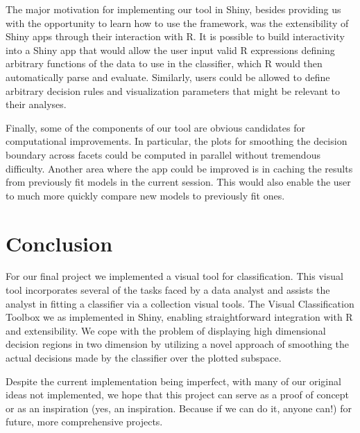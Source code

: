 \documentclass[tog]{acmsiggraph}
\begin{document}
The major motivation for implementing our tool in Shiny, besides providing us with the opportunity to learn how to use the framework, was the extensibility of Shiny apps through their interaction with R. It is possible to build interactivity into a Shiny app that would allow the user input valid R expressions defining arbitrary functions of the data to use in the classifier, which R would then automatically parse and evaluate. Similarly, users could be allowed to define arbitrary decision rules and visualization parameters that might be relevant to their analyses. 

Finally, some of the components of our tool are obvious candidates for computational improvements. In particular, the plots for smoothing the decision boundary across facets could be computed in parallel without tremendous difficulty. Another area where the app could be improved is in caching the results from previously fit models in the current session. This would also enable the user to much more quickly compare new models to previously fit ones. 

\section{Conclusion}
For our final project we implemented a visual tool for classification. This visual tool incorporates several of the tasks faced by a data analyst and assists the analyst in fitting a classifier via a collection visual tools. The Visual Classification Toolbox we as implemented in Shiny, enabling straightforward integration with R and extensibility. We cope with the problem of displaying high dimensional decision regions in two dimension by utilizing a novel approach of smoothing the actual decisions made by the classifier over the plotted subspace. 

Despite the current implementation being imperfect, with many of our original ideas not implemented, we hope that this project can serve as a proof of concept or as an inspiration (yes, an inspiration. Because if we can do it, anyone can!) for future, more comprehensive projects. 



\nocite{*}

\end{document}
